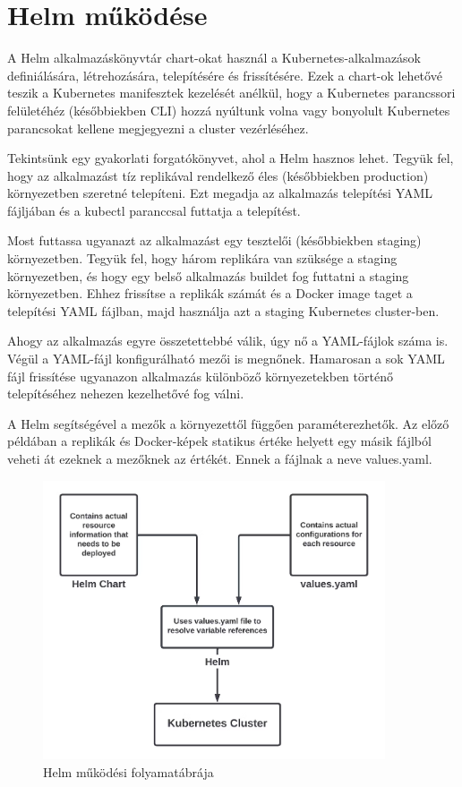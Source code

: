 \section{Helm működése}
A Helm alkalmazáskönyvtár chart-okat használ a Kubernetes-alkalmazások definiálására, létrehozására, telepítésére és frissítésére. Ezek a chart-ok lehetővé teszik a Kubernetes manifesztek kezelését anélkül, hogy a Kubernetes parancssori felületéhéz (későbbiekben CLI) hozzá nyúltunk volna vagy bonyolult Kubernetes parancsokat kellene megjegyezni a cluster vezérléséhez.

Tekintsünk egy gyakorlati forgatókönyvet, ahol a Helm hasznos lehet. Tegyük fel, hogy az alkalmazást tíz replikával rendelkező éles (későbbiekben production) környezetben szeretné telepíteni. Ezt megadja az alkalmazás telepítési YAML fájljában és a kubectl paranccsal futtatja a telepítést.

Most futtassa ugyanazt az alkalmazást egy tesztelői (későbbiekben staging) környezetben. Tegyük fel, hogy három replikára van szüksége a staging környezetben, és hogy egy belső alkalmazás buildet fog futtatni a staging környezetben. Ehhez frissítse a replikák számát és a Docker image taget a telepítési YAML fájlban, majd használja azt a staging Kubernetes cluster-ben.

Ahogy az alkalmazás egyre összetettebbé válik, úgy nő a YAML-fájlok száma is. Végül a YAML-fájl konfigurálható mezői is megnőnek. Hamarosan a sok YAML fájl frissítése ugyanazon alkalmazás különböző környezetekben történő telepítéséhez nehezen kezelhetővé fog válni.

A Helm segítségével a mezők a környezettől függően paraméterezhetők. Az előző példában a replikák és Docker-képek statikus értéke helyett egy másik fájlból veheti át ezeknek a mezőknek az értékét. Ennek a fájlnak a neve values.yaml.
\cite{helm}

\begin{figure}[ht]
    \centering
         \includegraphics[width=0.9\textwidth]{figures/helm/helm-overview.png}
          \caption{Helm működési folyamatábrája \cite{helm}}
           \label{helm-overview}
\end{figure}

